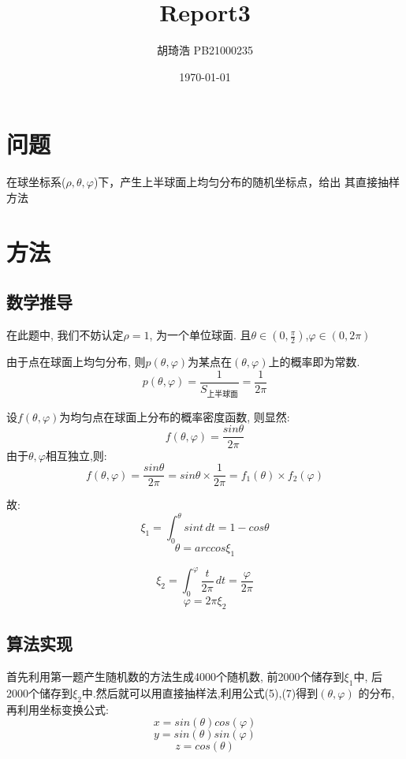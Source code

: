 \documentclass[UTF8]{ctexart}
\title{\textbf{Report3}}
\author{胡琦浩  PB21000235}
\date{\today}
\begin{document}
\maketitle
\section{问题}
在球坐标系($\rho ,\theta ,\varphi $)下，产生上半球面上均匀分布的随机坐标点，给出
其直接抽样方法

\section{方法}
\subsection{数学推导}
在此题中, 我们不妨认定$\rho =1$, 为一个单位球面. 且$\theta\in (0,\frac{\pi}{2})$,$\varphi \in(0,2\pi)$ 

由于点在球面上均匀分布, 则$p(\theta ,\varphi )$为某点在$(\theta ,\varphi )$上的概率即为常数.
\begin{equation}
    p(\theta ,\varphi )=\frac{1}{S_{\text{上半球面}}}=\frac{1}{2\pi}
\end{equation}

设$f(\theta ,\varphi )$为均匀点在球面上分布的概率密度函数, 则显然:
\begin{equation}
    f(\theta ,\varphi )=\frac{sin\theta }{2\pi}
\end{equation}
由于$\theta ,\varphi $相互独立,则:
\begin{equation}
    f(\theta ,\varphi )=\frac{sin\theta }{2\pi}=sin\theta \times \frac{1}{2\pi}=f_1(\theta ) \times f_2(\varphi )
\end{equation}

故:
\begin{equation}
    \xi _1=\int_{0}^{\theta } sint \,dt =1-cos\theta 
\end{equation}
\begin{equation}
    \theta =arccos\xi _1
\end{equation}

\begin{equation}
    \xi_2=\int_{0}^{\varphi } \frac{t}{2\pi} \,dt =\frac{\varphi }{2\pi}
\end{equation}
\begin{equation}
    \varphi =2\pi\xi_2
\end{equation}

\subsection{算法实现}
首先利用第一题产生随机数的方法生成4000个随机数, 前2000个储存到$\xi_1$中, 后2000个储存到$\xi_2$中.然后就可以用直接抽样法,利用公式(5),(7)得到$(\theta ,\varphi )$
的分布,再利用坐标变换公式:
\begin{equation}
    x=sin(\theta)cos(\varphi)
\end{equation}
\begin{equation}
    y=sin(\theta)sin(\varphi)
\end{equation}
\begin{equation}
    z=cos(\theta)
\end{equation}
\end{document}
